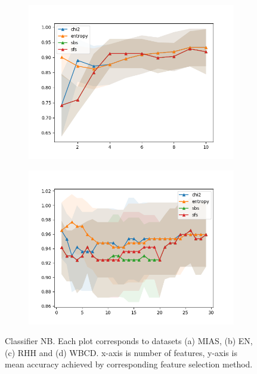 \begin{figure}[htbp]
  \begin{subfigure}[b]{0.475\textwidth}
      \centering
      \includegraphics[width=\textwidth]{../plots_with_std_fill/NBd3.png}
      \caption[]%
      {{\small}}
      \label{fig:NB_RHH}
  \end{subfigure}
  \quad
  \begin{subfigure}[b]{0.475\textwidth}
      \centering
      \includegraphics[width=\textwidth]{../plots_with_std_fill/NBd4.png}
      \caption[]%
      {{\small}}
      \label{fig:NB_WBCD}
  \end{subfigure}
  \caption[]
  {\small
    Classifier NB. Each plot corresponds to datasets (a) MIAS, (b) EN, (c) RHH and (d) WBCD. x-axis is number of features, y-axis is mean accuracy achieved by corresponding feature selection method.
  }
  \label{fig:plots_NB}
\end{figure}
